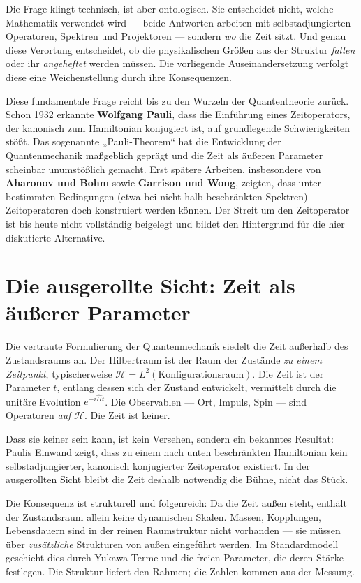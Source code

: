 Die Frage klingt technisch, ist aber ontologisch. Sie entscheidet nicht, welche Mathematik verwendet wird --- beide Antworten arbeiten mit selbstadjungierten Operatoren, Spektren und Projektoren --- sondern \emph{wo} die Zeit sitzt. Und genau diese Verortung entscheidet, ob die physikalischen Größen aus der Struktur \emph{fallen} oder ihr \emph{angeheftet} werden müssen. Die vorliegende Auseinandersetzung verfolgt diese eine Weichenstellung durch ihre Konsequenzen.

Diese fundamentale Frage reicht bis zu den Wurzeln der Quantentheorie zurück. Schon 1932 erkannte \textbf{Wolfgang Pauli}, dass die Einführung eines Zeitoperators, der kanonisch zum Hamiltonian konjugiert ist, auf grundlegende Schwierigkeiten stößt. Das sogenannte „Pauli-Theorem`` hat die Entwicklung der Quantenmechanik maßgeblich geprägt und die Zeit als äußeren Parameter scheinbar unumstößlich gemacht. Erst spätere Arbeiten, insbesondere von \textbf{Aharonov und Bohm} sowie \textbf{Garrison und Wong}, zeigten, dass unter bestimmten Bedingungen (etwa bei nicht halb-beschränkten Spektren) Zeitoperatoren doch konstruiert werden können. Der Streit um den Zeitoperator ist bis heute nicht vollständig beigelegt und bildet den Hintergrund für die hier diskutierte Alternative.

\section{Die ausgerollte Sicht: Zeit als äußerer Parameter}

Die vertraute Formulierung der Quantenmechanik siedelt die Zeit außerhalb des Zustandsraums an. Der Hilbertraum ist der Raum der Zustände \emph{zu einem Zeitpunkt}, typischerweise $\mathcal{H} = L^2(\text{Konfigurationsraum})$. Die Zeit ist der Parameter $t$, entlang dessen sich der Zustand entwickelt, vermittelt durch die unitäre Evolution $e^{-i\hat{H}t}$. Die Observablen --- Ort, Impuls, Spin --- sind Operatoren \emph{auf} $\mathcal{H}$. Die Zeit ist keiner.

Dass sie keiner sein kann, ist kein Versehen, sondern ein bekanntes Resultat: Paulis Einwand zeigt, dass zu einem nach unten beschränkten Hamiltonian kein selbstadjungierter, kanonisch konjugierter Zeitoperator existiert. In der ausgerollten Sicht bleibt die Zeit deshalb notwendig die Bühne, nicht das Stück.

Die Konsequenz ist strukturell und folgenreich: Da die Zeit außen steht, enthält der Zustandsraum allein keine dynamischen Skalen. Massen, Kopplungen, Lebensdauern sind in der reinen Raumstruktur nicht vorhanden --- sie müssen über \emph{zusätzliche} Strukturen von außen eingeführt werden. Im Standardmodell geschieht dies durch Yukawa-Terme und die freien Parameter, die deren Stärke festlegen. Die Struktur liefert den Rahmen; die Zahlen kommen aus der Messung.

